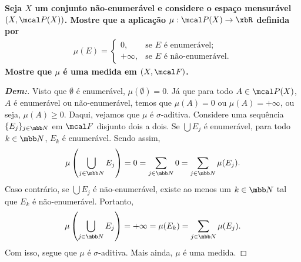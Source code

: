 \biglinend
\newpage 
{}
\myexe{\thedois}
\bigline
\textbf{Seja $X$ um conjunto não-enumerável e considere o espaço mensurável $(X, \mcal P(X))$. 
Mostre que a aplicação $\mu: \mcal P(X) \rightarrow \xbR$ definida por 
\begin{align*}
  \mu(E) = \begin{cases}
    0, &\text{se $E$ é enumerável;}\\
    +\infty, &\text{se $E$ é não-enumerável.}
  \end{cases}
\end{align*}
Mostre que $\mu$ é uma medida em $(X, \mcal F)$.}
\begin{proof}[\textbf{Dem:}]
Visto que $\emptyset$ é enumerável, $\mu(\emptyset) = 0$. Já que para todo $A \in \mcal P(X)$, 
  $A$ é enumerável ou não-enumerável, temos que $\mu(A) = 0$ ou $\mu(A) = +\infty$, ou seja, 
  $\mu(A) \ge 0$. Daqui, vejamos que $\mu$ é $\sigma$-aditiva. Considere uma sequência 
  $\{E_j\}_{j \in \mbb N}$ em $\mcal F$ disjunto dois a dois. Se $\bigcup E_j$ é enumerável, 
  para todo $k \in \mbb N$, $E_k$ é enumerável. Sendo assim, 
  \begin{align*}
    \mu\left(\bigcup\limits_{j \in \mbb N} E_j\right) = 0 
    = \sum_{j \in \mbb N} 0 = \sum_{j \in \mbb N} \mu(E_j).
  \end{align*}
  Caso contrário, se $\bigcup E_j$ é não-enumerável, existe ao menos um $k \in \mbb N$ 
  tal que $E_k$ é não-enumerável. Portanto, 
  \begin{align*}
    \mu\left(\bigcup_{j \in \mbb N} E_j\right) = +\infty = \mu(E_k)
    = \sum_{j \in \mbb N} \mu(E_j).
  \end{align*}
  Com isso, segue que $\mu$ é $\sigma$-aditiva. Mais ainda, $\mu$ é uma medida.
\end{proof}


